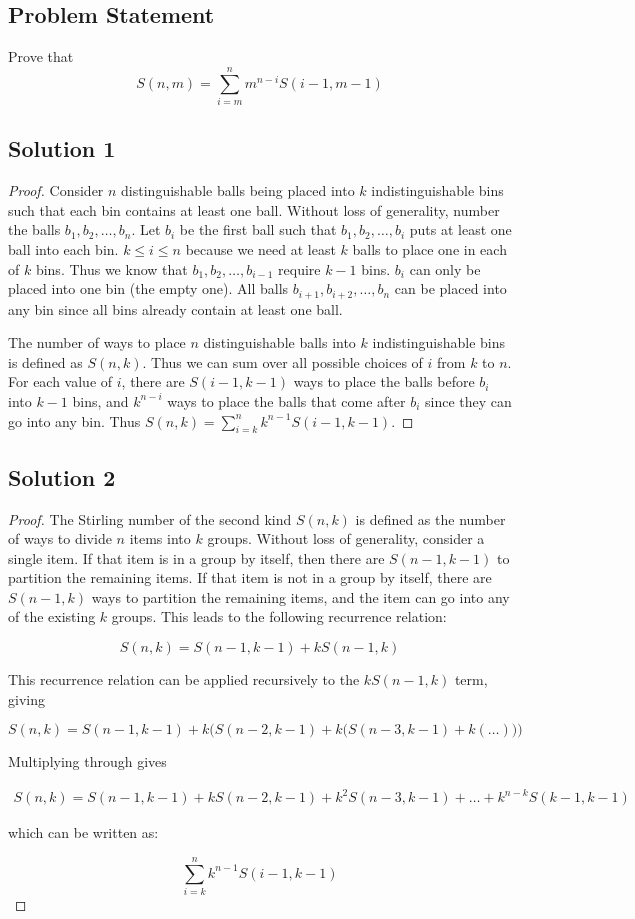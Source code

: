\documentclass[12pt]{article}
\begin{document}
\subsection*{Problem Statement}
Prove that 
\[
    S(n, m) = \sum_{i=m}^{n}m^{n-i}S(i-1, m-1)
\]
\subsection*{Solution 1}
\begin{proof}
Consider $n$ distinguishable balls being placed into $k$ indistinguishable bins such that each bin contains at least one ball. Without loss of generality, number the balls $b_1, b_2, \ldots, b_n$. Let $b_i$ be the first ball such that $b_1, b_2, \ldots, b_i$ puts at least one ball into each bin. $k \leq i \leq n$ because we need at least $k$ balls to place one in each of $k$ bins. Thus we know that $b_1, b_2, \ldots, b_{i-1}$ require $k-1$ bins. $b_i$ can only be placed into one bin (the empty one). All balls $b_{i+1}, b_{i+2}, \ldots, b_n$ can be placed into any bin since all bins already contain at least one ball. 

The number of ways to place $n$ distinguishable balls into $k$ indistinguishable bins is defined as $S(n,k)$. Thus we can sum over all possible choices of $i$ from $k$ to $n$. For each value of $i$, there are $S(i-1, k-1)$ ways to place the balls before $b_i$ into $k-1$ bins, and $k^{n-i}$ ways to place the balls that come after $b_i$ since they can go into any bin. Thus $S(n,k) = \sum_{i=k}^{n}k^{n-1}S(i-1, k-1)$.
\end{proof}

\subsection*{Solution 2}
\begin{proof}
    The Stirling number of the second kind $S(n,k)$ is defined as the number of ways to divide $n$ items into $k$ groups. Without loss of generality, consider a single item. If that item is in a group by itself, then there are $S(n-1, k-1)$ to partition the remaining items. If that item is not in a group by itself, there are $S(n-1, k)$ ways to partition the remaining items, and the item can go into any of the existing $k$ groups. This leads to the following recurrence relation:

\[
S(n,k) = S(n-1, k-1) + kS(n-1,k)
\]

This recurrence relation can be applied recursively to the $kS(n-1,k)$ term, giving 

\[
S(n,k) = S(n-1, k-1) + k\Big(   S(n-2, k-1) + k\big(   S(n-3, k-1) + k(\ldots )   \big)   \Big)
\]

Multiplying through gives 

\begin{multline*}
    S(n,k) = S(n-1, k-1) + kS(n-2, k-1) + k^2S(n-3, k-1) + \ldots + k^{n-k}S(k-1,k-1) 
\end{multline*}

which can be written as:

\[
\sum_{i=k}^{n}k^{n-1}S(i-1, k-1)
\]
\end{proof}
\end{document}

